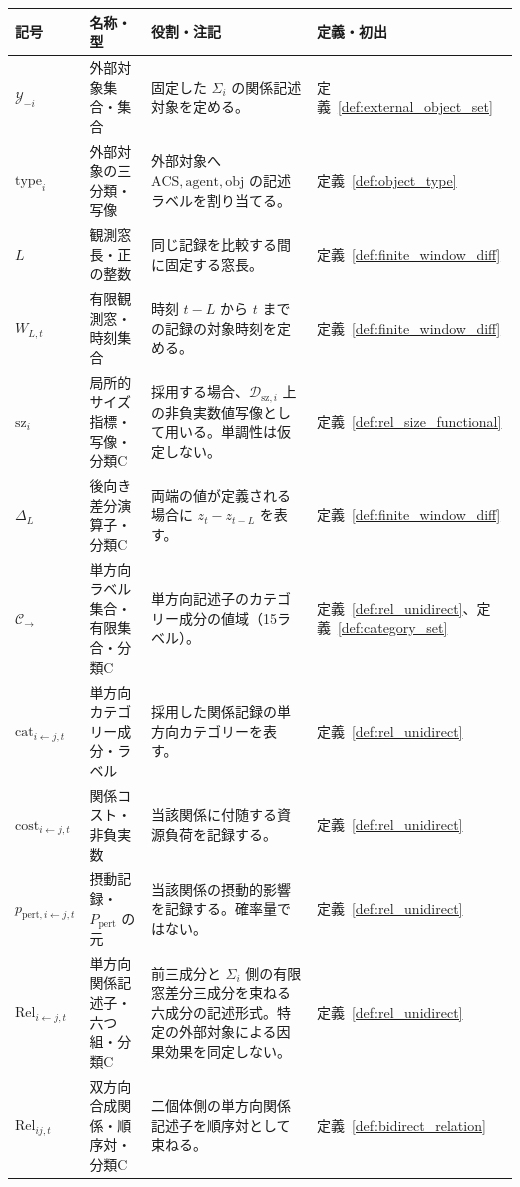 \begingroup
\small
\setlength{\tabcolsep}{4pt}
\renewcommand{\arraystretch}{1.18}
\begin{longtable}{p{3.0cm} p{3.0cm} p{6.6cm} p{2.0cm}}
\hline
\textbf{記号} & \textbf{名称・型} & \textbf{役割・注記} & \textbf{定義・初出} \\
\hline
\endhead
\hline
\endfoot
$\mathcal Y_{-i}$ & 外部対象集合・集合 &
固定した $\Sigma_i$ の関係記述対象を定める。 &
定義~\ref{def:external_object_set} \\[3pt]
$\mathrm{type}_i$ & 外部対象の三分類・写像 &
外部対象へ $\mathrm{ACS},\mathrm{agent},\mathrm{obj}$ の記述ラベルを割り当てる。 &
定義~\ref{def:object_type} \\[3pt]
$L$ & 観測窓長・正の整数 &
同じ記録を比較する間に固定する窓長。 &
定義~\ref{def:finite_window_diff} \\[3pt]
$W_{L,t}$ & 有限観測窓・時刻集合 &
時刻 $t-L$ から $t$ までの記録の対象時刻を定める。 &
定義~\ref{def:finite_window_diff} \\[3pt]
$\mathrm{sz}_i$ & 局所的サイズ指標・写像・分類C &
採用する場合、$\mathcal D_{\mathrm{sz},i}$ 上の非負実数値写像として用いる。単調性は仮定しない。 &
定義~\ref{def:rel_size_functional} \\[3pt]
$\Delta_L$ & 後向き差分演算子・分類C &
両端の値が定義される場合に $z_t-z_{t-L}$ を表す。 &
定義~\ref{def:finite_window_diff} \\[3pt]
$\mathcal C_{\rightarrow}$ & 単方向ラベル集合・有限集合・分類C &
単方向記述子のカテゴリー成分の値域（15ラベル）。 &
定義~\ref{def:rel_unidirect}、定義~\ref{def:category_set} \\[3pt]
$\mathrm{cat}_{i\leftarrow j,t}$ & 単方向カテゴリー成分・ラベル &
採用した関係記録の単方向カテゴリーを表す。 &
定義~\ref{def:rel_unidirect} \\[3pt]
$\mathrm{cost}_{i\leftarrow j,t}$ & 関係コスト・非負実数 &
当該関係に付随する資源負荷を記録する。 &
定義~\ref{def:rel_unidirect} \\[3pt]
$p_{\mathrm{pert},i\leftarrow j,t}$ & 摂動記録・$P_{\mathrm{pert}}$ の元 &
当該関係の摂動的影響を記録する。確率量ではない。 &
定義~\ref{def:rel_unidirect} \\[3pt]
$\mathrm{Rel}_{i\leftarrow j,t}$ & 単方向関係記述子・六つ組・分類C &
前三成分と $\Sigma_i$ 側の有限窓差分三成分を束ねる六成分の記述形式。特定の外部対象による因果効果を同定しない。 &
定義~\ref{def:rel_unidirect} \\[3pt]
$\mathrm{Rel}_{ij,t}$ & 双方向合成関係・順序対・分類C &
二個体側の単方向関係記述子を順序対として束ねる。 &
定義~\ref{def:bidirect_relation} \\[3pt]

\end{longtable}
